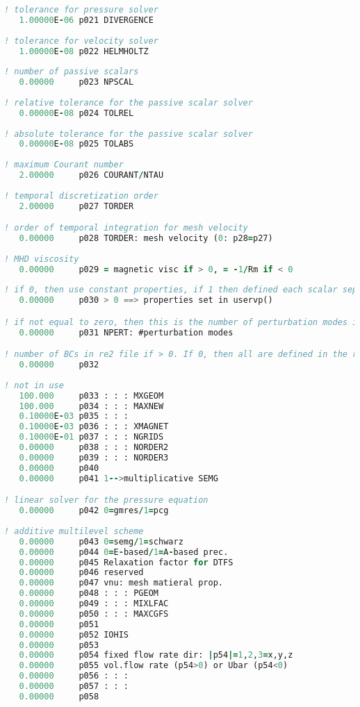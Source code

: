\documentclass[10pt]{article}
\numberwithin{equation}{section} %
\begin{document}
\begin{itemize}
\begin{lstlisting}[language=Fortran]
! tolerance for pressure solver
   1.00000E-06 p021 DIVERGENCE
   
! tolerance for velocity solver
   1.00000E-08 p022 HELMHOLTZ
   
! number of passive scalars
   0.00000     p023 NPSCAL
   
! relative tolerance for the passive scalar solver
   0.00000E-08 p024 TOLREL
   
! absolute tolerance for the passive scalar solver
   0.00000E-08 p025 TOLABS
   
! maximum Courant number
   2.00000     p026 COURANT/NTAU
   
! temporal discretization order
   2.00000     p027 TORDER

! order of temporal integration for mesh velocity
   0.00000     p028 TORDER: mesh velocity (0: p28=p27)
   
! MHD viscosity
   0.00000     p029 = magnetic visc if > 0, = -1/Rm if < 0
   
! if 0, then use constant properties, if 1 then defined each scalar separately, and if 2 then set all scalars at once in the USERVP subroutine
   0.00000     p030 > 0 ==> properties set in uservp()

! if not equal to zero, then this is the number of perturbation modes in linearized N-S
   0.00000     p031 NPERT: #perturbation modes

! number of BCs in re2 file if > 0. If 0, then all are defined in the re2 file
   0.00000     p032
   
! not in use
   100.000     p033 : : : MXGEOM
   100.000     p034 : : : MAXNEW
   0.10000E-03 p035 : : :
   0.10000E-03 p036 : : : XMAGNET
   0.10000E-01 p037 : : : NGRIDS
   0.00000     p038 : : : NORDER2
   0.00000     p039 : : : NORDER3
   0.00000     p040
   0.00000     p041 1-->multiplicative SEMG

! linear solver for the pressure equation
   0.00000     p042 0=gmres/1=pcg
   
! additive multilevel scheme
   0.00000     p043 0=semg/1=schwarz
   0.00000     p044 0=E-based/1=A-based prec.
   0.00000     p045 Relaxation factor for DTFS
   0.00000     p046 reserved
   0.00000     p047 vnu: mesh matieral prop.
   0.00000     p048 : : : PGEOM
   0.00000     p049 : : : MIXLFAC
   0.00000     p050 : : : MAXCGFS
   0.00000     p051
   0.00000     p052 IOHIS
   0.00000     p053
   0.00000     p054 fixed flow rate dir: |p54|=1,2,3=x,y,z
   0.00000     p055 vol.flow rate (p54>0) or Ubar (p54<0)
   0.00000     p056 : : :
   0.00000     p057 : : :
   0.00000     p058


\end{lstlisting}
\end{itemize}
\end{document}
